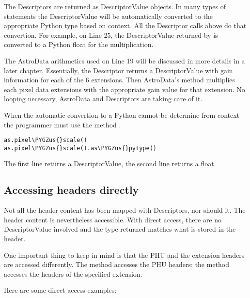 \documentclass[letterpaper,10pt,english]{sphinxmanual}
\def\PYGZus{\char`\_}
\begin{document}
The Descriptors are returned as DescriptorValue objects. In many types of
statements the DescriptorValue will be automatically converted to the
appropriate Python type based on context.  All the Descriptor calls above
do that convertion.  For example, on Line 25, the DescriptorValue returned
by  is converted to a Python float for the multiplication.

The AstroData arithmetics used on Line 19 will be discussed in more details
in a later chapter.  Essentially, the  Descriptor returns a
DescriptorValue with gain information for each of the 6 extensions.  Then
AstroData's  method multiplies each pixel data extensions with the
appropriate gain value for that extension.  No looping necessary, AstroData
and Descriptors are taking care of it.

When the automatic convertion to a Python cannot be determine from context
the programmer must use the method .

\begin{Verbatim}[commandchars=\\\{\}]
as.pixel\PYGZus{}scale()
as.pixel\PYGZus{}scale().as\PYGZus{}pytype()
\end{Verbatim}

The first line returns a DescriptorValue, the second line returns a float.


\subsection{Accessing headers directly}
\label{headers:accessing-headers-directly}
Not all the header content has been mapped with Descriptors, nor should it.
The header content is nevertheless accessible.  With direct access, there
are no DescriptorValue involved and the type returned matches what is stored
in the header.

One important thing to keep in mind is that the PHU and the extension headers
are accessed differently. The method  accesses the PHU
headers; the method  accesses the headers of the specified
extension.

Here are some direct access examples:
\end{document}
